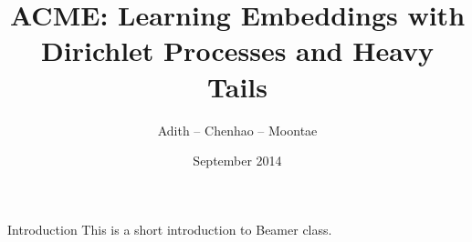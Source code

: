 \documentclass{beamer}
\title[ACME]{ACME: Learning Embeddings with Dirichlet Processes and Heavy Tails}
\author{Adith -- Chenhao -- Moontae}
\institute{Cornell}
\date{September 2014}
\begin{document}
\begin{frame}
\titlepage
\end{frame}

\begin{frame}{Introduction}
This is a short introduction to Beamer class.
\end{frame}
\end{document}

